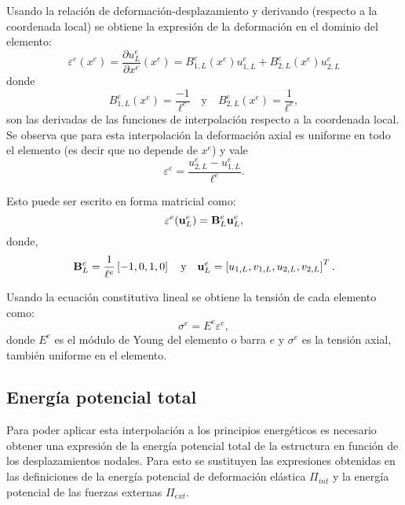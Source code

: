 %
Usando la relación de deformación-desplazamiento y derivando (respecto a la coordenada local) se obtiene la expresión de la deformación en el dominio del elemento:
%
\begin{equation}
\varepsilon^e(x^e) = \frac{\partial u^e_L}{\partial x^e}(x^e) =  B_{1,L}^e(x^e) u_{1,L}^e  + B_{2,L}^e(x^e) u_{2,L}^e
\end{equation}
%
donde 
\begin{equation}
B_{1,L}^e(x^e) = \frac{- 1}{\ell^e}
\quad \text{y} \quad B_{2,L}^e(x^e) = \frac{1}{\ell^e},
\end{equation}
son las derivadas de las funciones de interpolación respecto a la coordenada local. %
%
Se observa que para esta interpolación la deformación axial es uniforme en todo el elemento (es decir que no depende de $x^e$) y vale 
%
\begin{equation}
\varepsilon^e  =  \frac{ u_{2,L}^e - u_{1,L}^e } {\ell^e}.
\end{equation}


Esto puede ser escrito en forma matricial como:
%
\begin{equation} \label{eqn:expreps}
\varepsilon^e ({\bf u}^e_L) = {\bf B}_L^e {\bf u}^e_L,
\end{equation}
%
donde,
%
\begin{equation}
{\bf B}_L^e = \frac{1}{\ell^e} \left[-1, 0, 1, 0\right]
\quad \text{y} \quad
{\bf u}_L^e = \left[u_{1,L}, v_{1,L}, u_{2,L}, v_{2,L}\right]^T.
\end{equation}

Usando la ecuación constitutiva lineal se obtiene la tensión de cada elemento como:
%
\begin{equation}\label{eqn:barraeccons}
\sigma^e = E^e \varepsilon^e,
\end{equation}
donde $E^e$ es el módulo de Young del elemento o barra $e$ y $\sigma^e$ es la tensión axial, también uniforme en el elemento.


\subsection{Energía potencial total}

Para poder aplicar esta interpolación a los principios energéticos es necesario obtener una expresión de la energía potencial total de la estructura en función de los desplazamientos nodales. %
%
Para esto se sustituyen las expresiones obtenidas en las definiciones de la energía potencial de deformación elástica $\Pi_{int}$ y la energía potencial de las fuerzas externas $\Pi_{ext}$.

